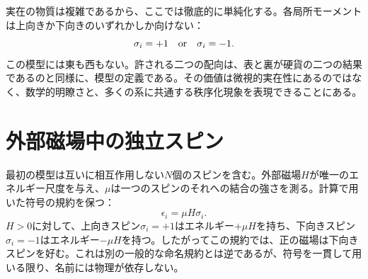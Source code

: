 \begin{classroomqa}
\end{classroomqa}

実在の物質は複雑であるから、ここでは徹底的に単純化する。各局所モーメントは上向きか下向きのいずれかしか向けない：
\begin{equation}
 \sigma_i=+1\quad\hbox{or}\quad\sigma_i=-1.
 \label{eq:sm8-ising-spin}
\end{equation}
この模型には東も西もない。許される二つの配向は、表と裏が硬貨の二つの結果であるのと同様に、模型の定義である。その価値は微視的実在性にあるのではなく、数学的明瞭さと、多くの系に共通する秩序化現象を表現できることにある。

\begin{classroomqa}
\end{classroomqa}

\section{外部磁場中の独立スピン}

最初の模型は互いに相互作用しない\(N\)個のスピンを含む。外部磁場\(H\)が唯一のエネルギー尺度を与え、\(\mu\)は一つのスピンのそれへの結合の強さを測る。計算で用いた符号の規約を保つ：
\begin{equation}
 \epsilon_i=\mu H\sigma_i.
 \label{eq:sm8-single-spin-energy}
\end{equation}
\(H>0\)に対して、上向きスピン\(\sigma_i=+1\)はエネルギー\(+\mu H\)を持ち、下向きスピン\(\sigma_i=-1\)はエネルギー\(-\mu H\)を持つ。したがってこの規約では、正の磁場は下向きスピンを好む。これは別の一般的な命名規約とは逆であるが、符号を一貫して用いる限り、名前には物理が依存しない。


